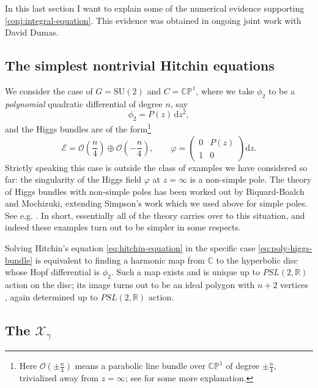 \documentclass[12pt,letterpaper,reqno]{article}
\numberwithin{equation}{section}
\newcommand{\cO}{\ensuremath{\mathcal O}}
\newcommand{\cX}{\ensuremath{\mathcal X}}
\newcommand{\R}{\ensuremath{\mathbb R}}
\newcommand{\C}{\ensuremath{\mathbb C}}
\newcommand{\PP}{\ensuremath{\mathbb P}}
\newcommand{\cE}{{\mathcal E}}
\newcommand{\de}{\mathrm{d}}
\newcommand{\ti}[1]{\textit{#1}}
\newcommand{\SU}{\mathrm{SU}}
\newcommand{\insfig}[2]{

\medskip
\noindent
\begin{minipage}{\linewidth}

\makebox[\linewidth]{\texttt{[image: figures/\#1-crop.pdf]}}

\end{minipage}
\medskip

}
\begin{document}
In this last section I want to explain some of the numerical
evidence supporting \autoref{conj:integral-equation}.
This evidence was obtained in ongoing joint work with 
David Dumas.


\subsection{The simplest nontrivial Hitchin equations}

We consider the case of $G = \SU(2)$ 
and $C = \C\PP^1$, where we take $\phi_2$ to be a
\ti{polynomial} quadratic differential
of degree $n$, say
\begin{equation} \label{eq:poly-quad}
  \phi_2 = P(z) \, \de z^2,
\end{equation}
and the Higgs bundles are 
of the form\footnote{Here $\cO(\pm\frac{n}{4})$ means a parabolic line bundle 
over $\C\PP^1$ of
degree $\pm \frac{n}{4}$, trivialized away from $z = \infty$; see \cite{Fredrickson2017} for some more explanation.
}
\begin{equation} \label{eq:poly-higgs-bundle}
  \cE = \cO\left(\frac{n}{4}\right) \oplus \cO\left(-\frac{n}{4}\right), \qquad \varphi = \begin{pmatrix} 0 & P(z) \\ 1 & 0 \end{pmatrix} \de z.
\end{equation}
Strictly speaking this case is outside the class of
examples we have considered so far: the singularity
of the Higgs field $\varphi$ 
at $z = \infty$ is a non-simple pole.
The theory of Higgs bundles with non-simple poles
has been worked out by Biquard-Boalch and Mochizuki, extending
Simpson's work which we used above for simple
poles. See e.g. \cite{wnh}.
In short, essentially all
of the theory carries over to this situation, and indeed
these examples turn out to be simpler in some respects.

Solving Hitchin's equation \eqref{eq:hitchin-equation} 
in the specific
case \eqref{eq:poly-higgs-bundle} is equivalent to 
finding a harmonic map from $\C$ to the hyperbolic disc whose  Hopf differential is $\phi_2$. Such a map exists and 
is unique up to $PSL(2,\R)$ action on the disc; its image
turns out to be an ideal polygon with $n+2$ vertices
\cite{HTTW}, again determined up to $PSL(2,\R)$ action.

\insfig{higgs-metric-15}{0.8}


\subsection{The \texorpdfstring{$\cX_\gamma$}{Xgamma}}
\end{document}
